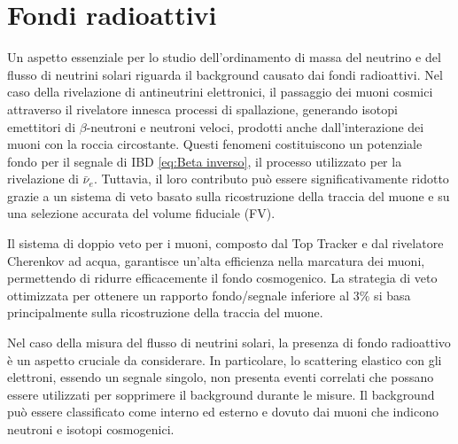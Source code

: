 \section{Fondi radioattivi}
\label{sec:fondi}
Un aspetto essenziale per lo studio dell'ordinamento di massa del neutrino e del flusso di neutrini solari \cite{JUNO:2020hqc} riguarda il background causato dai fondi radioattivi. Nel caso della rivelazione di antineutrini elettronici, il passaggio dei muoni cosmici attraverso il rivelatore innesca processi di spallazione, generando isotopi emettitori di $\beta$-neutroni e neutroni veloci, prodotti anche dall'interazione dei muoni con la roccia circostante. Questi fenomeni costituiscono un potenziale fondo per il segnale di IBD \ref{eq:Beta inverso}, il processo utilizzato per la rivelazione di $\bar{\nu}_e$. Tuttavia, il loro contributo può essere significativamente ridotto grazie a un sistema di veto basato sulla ricostruzione della traccia del muone e su una selezione accurata del volume fiduciale (FV). 

Il sistema di doppio veto per i muoni, composto dal Top Tracker e dal rivelatore Cherenkov ad acqua, garantisce un'alta efficienza nella marcatura dei muoni, permettendo di ridurre efficacemente il fondo cosmogenico. La strategia di veto ottimizzata per ottenere un rapporto fondo/segnale inferiore al $3\%$ si basa principalmente sulla ricostruzione della traccia del muone. 

Nel caso della misura del flusso di neutrini solari, la presenza di fondo radioattivo è un aspetto cruciale da considerare. In particolare, lo scattering elastico con gli elettroni, essendo un segnale singolo, non presenta eventi correlati che possano essere utilizzati per sopprimere il background durante le misure. Il background può essere classificato come interno ed esterno e dovuto dai muoni che indicono neutroni e isotopi cosmogenici.
\vspace{0,2cm}

